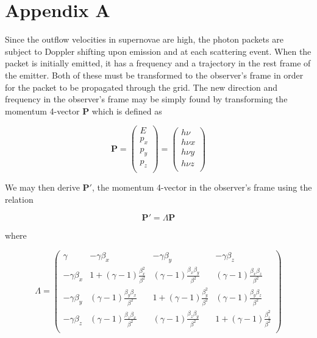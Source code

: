 \documentclass[useAMS,usenatbib,usegraphicx]{mnras}
\begin{document}
\appendix

\section[]{Appendix A}

Since the outflow velocities in supernovae are high, the photon packets 
are subject to Doppler shifting upon emission and at each scattering event.  
When the packet is initially emitted, it has a frequency and a trajectory 
in the rest frame of the emitter. Both of these must be transformed to the 
observer's frame in order for the packet to be propagated through the 
grid.  The new direction and frequency in the observer's frame may be 
simply found by transforming the momentum 4-vector $\mathbf{P}$ which is 
defined as

\begin{equation}
\mathbf{P}=
\begin{pmatrix}
	E \\
	p_x \\
	p_y \\
	p_z \\
	\end{pmatrix} =
	\begin{pmatrix}
	h \nu \\
	h \nu x \\
	h \nu y \\
	h \nu z \\
	\end{pmatrix}
\end{equation}


\noindent We may then derive $\mathbf{P'}$, the momentum 4-vector in the 
observer's frame using the relation

\begin{equation}
	\mathbf{P'}=\Lambda \mathbf{P}	
\end{equation}

\noindent where 

\[
	{\Lambda}=
	 \begin{pmatrix} 
	  \gamma & -\gamma \beta_x & -\gamma \beta_y & -\gamma \beta_z \\
	 -\gamma \beta_x & 1+(\gamma-1)\frac{\beta_x^2}{\beta^2} & (\gamma-1)\frac{\beta_x \beta_y}{\beta^2} & (\gamma-1)\frac{\beta_x \beta_z}{\beta^2} \\
	 -\gamma \beta_y  & (\gamma-1)\frac{\beta_y \beta_x}{\beta^2} & 1+(\gamma-1)\frac{\beta_y^2}{\beta^2} & (\gamma-1)\frac{\beta_y \beta_z}{\beta^2} \\
	 -\gamma \beta_z & (\gamma-1)\frac{\beta_z \beta_x}{\beta^2} & (\gamma-1)\frac{\beta_z \beta_y}{\beta^2} & 1+(\gamma-1)\frac{\beta_z^2}{\beta^2} \\
	 \end{pmatrix}
\]
\end{document}
